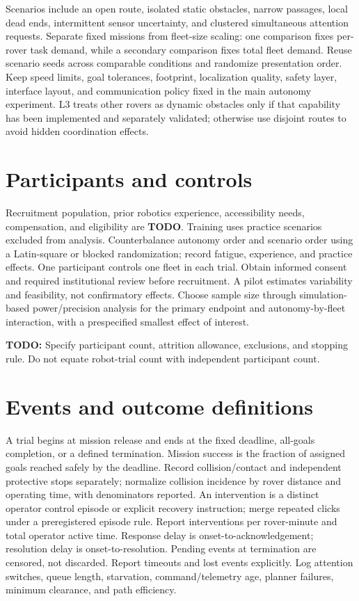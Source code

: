 \documentclass[12pt,oneside]{report}
\newcommand{\todo}[1]{\par\noindent\textcolor{red!65!black}{\textbf{TODO:} #1}\par}
\begin{document}
Scenarios include an open route, isolated static obstacles, narrow passages, local dead ends, intermittent sensor uncertainty, and clustered simultaneous attention requests. Separate fixed missions from fleet-size scaling: one comparison fixes per-rover task demand, while a secondary comparison fixes total fleet demand. Reuse scenario seeds across comparable conditions and randomize presentation order. Keep speed limits, goal tolerances, footprint, localization quality, safety layer, interface layout, and communication policy fixed in the main autonomy experiment. L3 treats other rovers as dynamic obstacles only if that capability has been implemented and separately validated; otherwise use disjoint routes to avoid hidden coordination effects.

\section{Participants and controls}
Recruitment population, prior robotics experience, accessibility needs, compensation, and eligibility are \textbf{TODO}. Training uses practice scenarios excluded from analysis. Counterbalance autonomy order and scenario order using a Latin-square or blocked randomization; record fatigue, experience, and practice effects. One participant controls one fleet in each trial. Obtain informed consent and required institutional review before recruitment. A pilot estimates variability and feasibility, not confirmatory effects. Choose sample size through simulation-based power/precision analysis for the primary endpoint and autonomy-by-fleet interaction, with a prespecified smallest effect of interest. \todo{Specify participant count, attrition allowance, exclusions, and stopping rule. Do not equate robot-trial count with independent participant count.}

\section{Events and outcome definitions}
A trial begins at mission release and ends at the fixed deadline, all-goals completion, or a defined termination. Mission success is the fraction of assigned goals reached safely by the deadline. Record collision/contact and independent protective stops separately; normalize collision incidence by rover distance and operating time, with denominators reported. An intervention is a distinct operator control episode or explicit recovery instruction; merge repeated clicks under a preregistered episode rule. Report interventions per rover-minute and total operator active time. Response delay is onset-to-acknowledgement; resolution delay is onset-to-resolution. Pending events at termination are censored, not discarded. Report timeouts and lost events explicitly. Log attention switches, queue length, starvation, command/telemetry age, planner failures, minimum clearance, and path efficiency.
\end{document}

